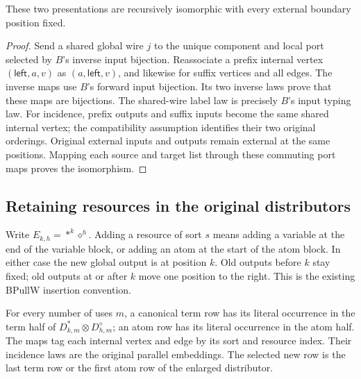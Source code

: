 \begin{theorem}
These two presentations are recursively isomorphic with every external
boundary position fixed.
\end{theorem}
\begin{proof}
Send a shared global wire $j$ to the unique component and local port selected
by $B$'s inverse input bijection. Reassociate a prefix internal vertex
$(\mathsf{left},a,v)$ as $(a,\mathsf{left},v)$, and likewise for suffix
vertices and all edges. The inverse maps use $B$'s forward input bijection.
Its two inverse laws prove that these maps are bijections. The shared-wire
label law is precisely $B$'s input typing law. For incidence, prefix outputs
and suffix inputs become the same shared internal vertex; the compatibility
assumption identifies their two original orderings. Original external inputs
and outputs remain external at the same positions. Mapping each source and
target list through these commuting port maps proves the isomorphism.
\end{proof}

\subsection{Retaining resources in the original distributors}
Write $E_{k,h}=*^k\diamond^h$. Adding a resource of sort $s$ means adding a
variable at the end of the variable block, or adding an atom at the start
of the atom block. In either case the new global output is at position $k$.
Old outputs before $k$ stay fixed; old outputs at or after $k$ move one
position to the right. This is the existing BPullW insertion convention.

For every number of uses $m$, a canonical term row has its literal occurrence
in the term half of $D_{k,m}^{*}\otimes D_{h,m}^{\diamond}$; an atom row has
its literal occurrence in the atom half. The maps tag each internal vertex
and edge by its sort and resource index. Their incidence laws are the
original parallel embeddings. The selected new row is the last term row
or the first atom row of the enlarged distributor.

